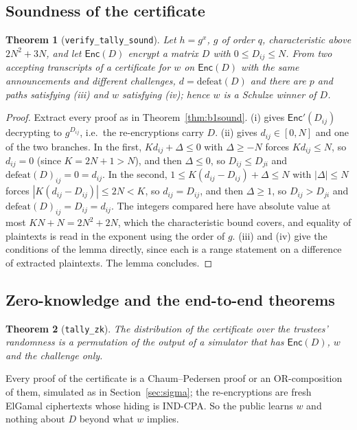 \documentclass[11pt,a4paper]{article}
\newcommand{\Enc}{\mathsf{Enc}}
\newcommand{\rocq}[1]{\texttt{#1}}
\newtheorem{theorem}{Theorem}[section]
\theoremstyle{remark}
\begin{document}
\subsection{Soundness of the certificate}
\begin{theorem}[\rocq{verify\_tally\_sound}]
Let $h = g^x$, $g$ of order $q$, characteristic above $2N^2 + 3N$, and let
$\Enc(D)$ encrypt a matrix $D$ with $0 \le D_{ij} \le N$. From two
accepting transcripts of a certificate for $w$ on $\Enc(D)$ with the same
announcements and different challenges, $d = \mathrm{defeat}(D)$ and there
are $p$ and paths satisfying (iii) and $w$ satisfying (iv); hence $w$ is a
Schulze winner of $D$.
\end{theorem}
\begin{proof}
Extract every proof as in Theorem~\ref{thm:b1sound}. (i) gives
$\Enc'(D_{ij})$ decrypting to $g^{D_{ij}}$, i.e.\ the re-encryptions carry
$D$. (ii) gives $d_{ij} \in [0, N]$ and one of the two branches. In the
first, $K d_{ij} + \Delta \le 0$ with $\Delta \ge -N$ forces $K d_{ij} \le
N$, so $d_{ij} = 0$ (since $K = 2N + 1 > N$), and then $\Delta \le 0$, so
$D_{ij} \le D_{ji}$ and $\mathrm{defeat}(D)_{ij} = 0 = d_{ij}$. In the
second, $1 \le K(d_{ij} - D_{ij}) + \Delta \le N$ with $|\Delta| \le N$
forces $|K (d_{ij} - D_{ij})| \le 2N < K$, so $d_{ij} = D_{ij}$, and then
$\Delta \ge 1$, so $D_{ij} > D_{ji}$ and $\mathrm{defeat}(D)_{ij} = D_{ij}
= d_{ij}$. The integers compared here have absolute value at most $K N + N
= 2N^2 + 2N$, which the characteristic bound covers, and equality of
plaintexts is read in the exponent using the order of $g$. (iii) and (iv)
give the conditions of the lemma directly, since each is a range statement
on a difference of extracted plaintexts. The lemma concludes.
\end{proof}

\subsection{Zero-knowledge and the end-to-end theorems}
\begin{theorem}[\rocq{tally\_zk}]
The distribution of the certificate over the trustees' randomness is a
permutation of the output of a simulator that has $\Enc(D)$, $w$ and the
challenge only.
\end{theorem}
Every proof of the certificate is a Chaum--Pedersen proof or an
OR-composition of them, simulated as in Section~\ref{sec:sigma}; the
re-encryptions are fresh ElGamal ciphertexts whose hiding is IND-CPA. So
the public learns $w$ and nothing about $D$ beyond what $w$ implies.
\end{document}
